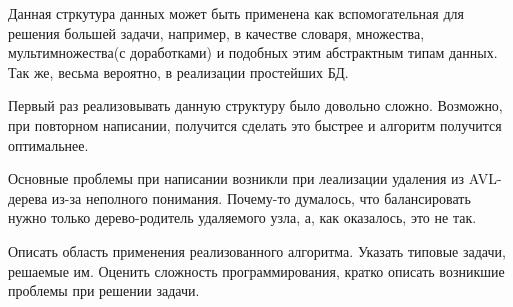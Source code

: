 \documentclass[12pt]{article}
\begin{document}
Данная стркутура данных может быть применена как вспомогательная для решения большей задачи, например, в качестве словаря, множества, мультимножества(с доработками) и подобных этим абстрактным типам данных. Так же, весьма вероятно, в реализации простейших БД.

Первый раз реализовывать данную структуру было довольно сложно. Возможно, при повторном написании, получится сделать это быстрее и алгоритм получится оптимальнее.

Основные проблемы при написании возникли при леализации удаления из AVL-дерева из-за неполного понимания. Почему-то думалось, что балансировать нужно только дерево-родитель удаляемого узла, а, как оказалось, это не так.

Описать область применения реализованного алгоритма. Указать типовые
задачи, решаемые им. Оценить сложность программирования, кратко
описать возникшие проблемы при решении задачи. 
\end{document}
